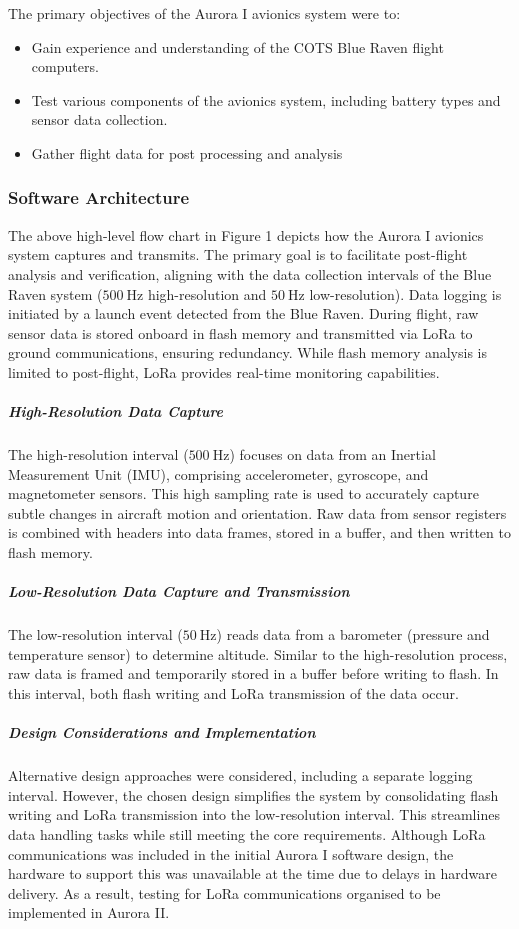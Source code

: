 \noindent The primary objectives of the Aurora I avionics system were to: 
\begin{itemize}
  \item Gain experience and understanding of the COTS Blue Raven flight computers. 
  \item Test various components of the avionics system, including battery types and sensor data collection. 
  \item Gather flight data for post processing and analysis
\end{itemize}

\subsubsection{Software Architecture}
The above high-level flow chart in Figure 1 depicts how the Aurora I avionics system captures and transmits. The primary goal is to facilitate post-flight analysis and verification, aligning with the data collection intervals of the Blue Raven system ($\SI{500}{\hertz}$ high-resolution and $\SI{50}{\hertz}$ low-resolution). Data logging is initiated by a launch event detected from the Blue Raven. During flight, raw sensor data is stored onboard in flash memory and transmitted via LoRa to ground communications, ensuring redundancy. While flash memory analysis is limited to post-flight, LoRa provides real-time monitoring capabilities. 

\subparagraph{High-Resolution Data Capture}

The high-resolution interval ($\SI{500}{\hertz}$) focuses on data from an Inertial Measurement Unit (IMU), comprising accelerometer, gyroscope, and magnetometer sensors. This high sampling rate is used to accurately capture subtle changes in aircraft motion and orientation. Raw data from sensor registers is combined with headers into data frames, stored in a buffer, and then written to flash memory. 

\subparagraph{Low-Resolution Data Capture and Transmission}

The low-resolution interval ($\SI{50}{\hertz}$) reads data from a barometer (pressure and temperature sensor) to determine altitude. Similar to the high-resolution process, raw data is framed and temporarily stored in a buffer before writing to flash. In this interval, both flash writing and LoRa transmission of the data occur. 

\subparagraph{Design Considerations and Implementation}

Alternative design approaches were considered, including a separate logging interval. However, the chosen design simplifies the system by consolidating flash writing and LoRa transmission into the low-resolution interval. This streamlines data handling tasks while still meeting the core requirements. Although LoRa communications was included in the initial Aurora I software design, the hardware to support this was unavailable at the time due to delays in hardware delivery. As a result, testing for LoRa communications organised to be implemented in Aurora II.  

